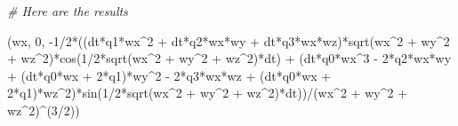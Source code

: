 \documentclass[]{article}
\newenvironment{Shaded}{}{}
\newcommand{\DecValTok}[1]{\textcolor[rgb]{0.25,0.63,0.44}{#1}}
\newcommand{\CommentTok}[1]{\textcolor[rgb]{0.38,0.63,0.69}{\textit{#1}}}
\newcommand{\OperatorTok}[1]{\textcolor[rgb]{0.40,0.40,0.40}{#1}}
\newcommand{\NormalTok}[1]{#1}
\begin{document}
\begin{Shaded}
\begin{Highlighting}[]
\CommentTok{# Here are the results}

\NormalTok{(wx, }\DecValTok{0}\NormalTok{, }\OperatorTok{-}\DecValTok{1}\OperatorTok{/}\DecValTok{2}\OperatorTok{*}\NormalTok{((dt}\OperatorTok{*}\NormalTok{q1}\OperatorTok{*}\NormalTok{wx}\OperatorTok{^}\DecValTok{2} \OperatorTok{+}\NormalTok{ dt}\OperatorTok{*}\NormalTok{q2}\OperatorTok{*}\NormalTok{wx}\OperatorTok{*}\NormalTok{wy }\OperatorTok{+}\NormalTok{ dt}\OperatorTok{*}\NormalTok{q3}\OperatorTok{*}\NormalTok{wx}\OperatorTok{*}\NormalTok{wz)}\OperatorTok{*}\NormalTok{sqrt(wx}\OperatorTok{^}\DecValTok{2} \OperatorTok{+}\NormalTok{ wy}\OperatorTok{^}\DecValTok{2} \OperatorTok{+}\NormalTok{ wz}\OperatorTok{^}\DecValTok{2}\NormalTok{)}\OperatorTok{*}\NormalTok{cos(}\DecValTok{1}\OperatorTok{/}\DecValTok{2}\OperatorTok{*}\NormalTok{sqrt(wx}\OperatorTok{^}\DecValTok{2} \OperatorTok{+}\NormalTok{ wy}\OperatorTok{^}\DecValTok{2} \OperatorTok{+}\NormalTok{ wz}\OperatorTok{^}\DecValTok{2}\NormalTok{)}\OperatorTok{*}\NormalTok{dt) }\OperatorTok{+}\NormalTok{ (dt}\OperatorTok{*}\NormalTok{q0}\OperatorTok{*}\NormalTok{wx}\OperatorTok{^}\DecValTok{3} \OperatorTok{-} \DecValTok{2}\OperatorTok{*}\NormalTok{q2}\OperatorTok{*}\NormalTok{wx}\OperatorTok{*}\NormalTok{wy }\OperatorTok{+}\NormalTok{ (dt}\OperatorTok{*}\NormalTok{q0}\OperatorTok{*}\NormalTok{wx }\OperatorTok{+} \DecValTok{2}\OperatorTok{*}\NormalTok{q1)}\OperatorTok{*}\NormalTok{wy}\OperatorTok{^}\DecValTok{2} \OperatorTok{-} \DecValTok{2}\OperatorTok{*}\NormalTok{q3}\OperatorTok{*}\NormalTok{wx}\OperatorTok{*}\NormalTok{wz }\OperatorTok{+}\NormalTok{ (dt}\OperatorTok{*}\NormalTok{q0}\OperatorTok{*}\NormalTok{wx }\OperatorTok{+} \DecValTok{2}\OperatorTok{*}\NormalTok{q1)}\OperatorTok{*}\NormalTok{wz}\OperatorTok{^}\DecValTok{2}\NormalTok{)}\OperatorTok{*}\NormalTok{sin(}\DecValTok{1}\OperatorTok{/}\DecValTok{2}\OperatorTok{*}\NormalTok{sqrt(wx}\OperatorTok{^}\DecValTok{2} \OperatorTok{+}\NormalTok{ wy}\OperatorTok{^}\DecValTok{2} \OperatorTok{+}\NormalTok{ wz}\OperatorTok{^}\DecValTok{2}\NormalTok{)}\OperatorTok{*}\NormalTok{dt))}\OperatorTok{/}\NormalTok{(wx}\OperatorTok{^}\DecValTok{2} \OperatorTok{+}\NormalTok{ wy}\OperatorTok{^}\DecValTok{2} \OperatorTok{+}\NormalTok{ wz}\OperatorTok{^}\DecValTok{2}\NormalTok{)}\OperatorTok{^}\NormalTok{(}\DecValTok{3}\OperatorTok{/}\DecValTok{2}\NormalTok{))}

\end{Highlighting}
\end{Shaded}
\end{document}
